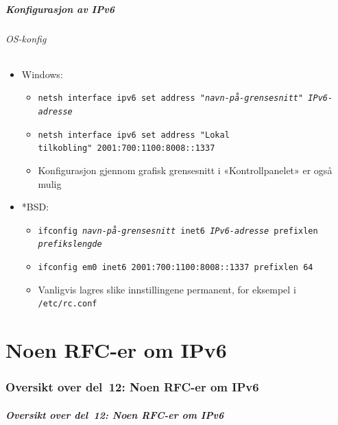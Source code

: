 \begin{frame}%
  \frametitle{Konfigurasjon av IPv6}
  \framesubtitle{OS-konfig}
  \begin{itemize}[<+->]
  \item Windows:
    \begin{itemize}[<+->]
    \item \texttt{netsh interface ipv6 set address\ "\textit{navn-på-grensesnitt}"\ \textit{IPv6-adresse}}
    \item \texttt{netsh interface ipv6 set address\ "\texttt{Lokal tilkobling}"\ 2001:700:1100:8008::1337}
    \item Konfigurasjon gjennom grafisk grensesnitt i «Kontrollpanelet» er også mulig
    \end{itemize}
  \item *BSD:
    \begin{itemize}[<+->]
    \item \texttt{ifconfig \textit{navn-på-grensesnitt} inet6 \textit{IPv6-adresse} prefixlen \textit{prefikslengde}}
    \item \texttt{ifconfig em0 inet6 2001:700:1100:8008::1337 prefixlen 64}
    \item Vanligvis lagres slike innstillingene permanent, for eksempel i \texttt{/etc/rc.conf}
    \end{itemize}
  \end{itemize}
\end{frame}

\part{Noen RFC-er om IPv6}

\begin{frame}
  \partpage
\end{frame}

\section*{Oversikt over del~12: Noen RFC-er om IPv6}
\begin{frame}[allowframebreaks]
  \frametitle{Oversikt over del~12: Noen RFC-er om IPv6}
    \tableofcontents%
\end{frame}

